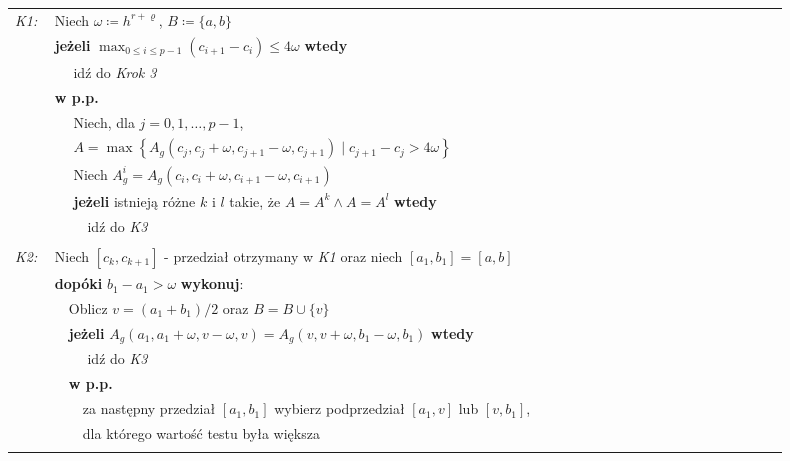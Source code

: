 \documentclass[oik, pdftex, robocza, man]{mgrwms}
\begin{document}
    \vspace{10pt}
    \begin{tabular}{p{0.045\linewidth} p{0.85\linewidth}}
        \textit{K1:}    & Niech $\omega \coloneqq h^{r+\varrho}$, $B \coloneqq \{a, b\}$ \\
                        & \textbf{jeżeli} \(\displaystyle \max_{0 \leq i \leq p-1} (c_{i+1} - c_{i}) \leq 4\omega \) \textbf{wtedy} \\
                        & $\quad$ idź do \textit{Krok 3} \\
                        & \textbf{w p.p.} \\
                        & $\quad$ Niech, dla $j=0,1, \ldots, p-1$, \\
                        & $\quad$ $A=\max \left\{A_{g}\left(c_{j}, c_{j}+\omega, c_{j+1}-\omega, c_{j+1}\right) \mid c_{j+1}-c_{j}>4 \omega\right\}$ \\
                        & $\quad$ Niech $A_{g}^{i} = A_{g}\left(c_{i}, c_{i}+\omega, c_{i+1}-\omega, c_{i+1}\right)$ \\
                        & $\quad$ \textbf{jeżeli} istnieją różne $k$ i $l$ takie, że $A = A^{k} \land A = A^{l}$ \textbf{wtedy} \\
                        & $\quad\quad$ idź do \textit{K3} \\
                        & \\

        \textit{K2:}    & Niech $[c_{k}, c_{k+1}]$ - przedział otrzymany w \textit{K1} oraz niech $[a_{1}, b_{1}] = [a, b]$ \\
                        & \textbf{dopóki} $b_{1} - a_{1} > \omega$ \textbf{wykonuj}: \\
                        & $\quad$Oblicz $v = (a_{1} + b_{1}) / 2$ oraz $B = B \cup \{v\}$ \\
                        & $\quad$\textbf{jeżeli} $A_{g}(a_{1}, a_{1} + \omega, v - \omega, v) = A_{g}(v, v + \omega, b_{1} - \omega, b_{1})$ \textbf{wtedy} \\
                        & $\quad$$\quad$ idź do \textit{K3} \\
                        & $\quad$\textbf{w p.p.} \\
                        & $\quad$$\quad$za następny przedział $[a_{1}, b_{1}]$ wybierz podprzedział $[a_{1}, v]$ lub $[v, b_{1}]$, \\
                        & $\quad$$\quad$dla którego wartość testu była większa \\
                        &  \\


\end{tabular}
\end{document}
